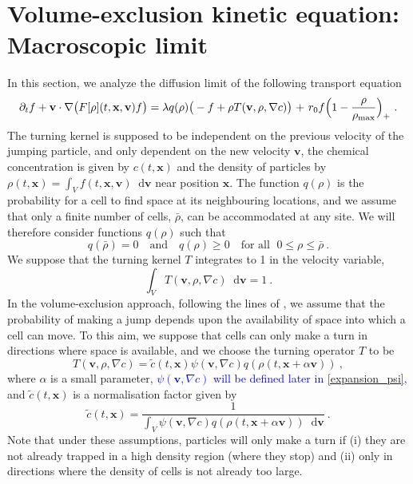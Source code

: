 \documentclass{article}
\newcommand*\diff{\mathop{}\!\mathrm{d}}
\begin{document}
\section{Volume-exclusion kinetic equation: Macroscopic limit}
\label{sec:model}
In this section, we analyze the diffusion limit of the following transport equation
\begin{equation}
    \partial_t f+\mathbf{v}\cdot \nabla\big(F[\rho](t,\mathbf{x},\mathbf{v}) f\big)= \lambda q(\rho)\big(-f+\rho T(\mathbf{v},\rho,\nabla c)\big){\ +\ r_0f\Bigl(1-\frac{\rho}{\rho_{\textnormal{max}}} \Bigr)_+}\ . \nonumber
\end{equation}
The turning kernel is supposed to be independent on the previous velocity of the jumping particle, and only dependent on the new velocity $\mathbf{v}$, the chemical concentration is given by $c(t,\mathbf{x})$ and the density of particles by $\rho(t,\mathbf{x})=\int_V f(t,\textbf{x},\mathbf{v})\diff \mathbf{v}$ near position $\mathbf{x}$.
\noindent The function $q(\rho)$ is the probability {for a cell to find} space at its neighbouring locations, and we assume that only a finite number of cells, $\bar{\rho}$, can be accommodated at any site. We will therefore consider functions $q(\rho)$ such that
\begin{equation}
q(\bar{\rho}) = 0 \quad \text{and} \quad q(\rho) \geq 0 \quad \text{for all } \; 0\leq \rho \leq \bar{\rho}\ . \nonumber
\end{equation}
We {suppose that the turning kernel $T$ integrates to 1 in the velocity variable},
\begin{equation}
\int_V T(\textbf{v},\rho,\nabla c)\diff \mathbf{v}=1\ . \nonumber
\end{equation}
In the volume-exclusion approach, following the lines of \cite{Hillen2009}, we assume that the probability of making a jump depends upon the availability of space into which {{a cell}} can move. To this aim, we suppose that cells can only make a turn in directions where space is available, and we choose the turning operator $T$ to be
\begin{equation*}
    T(\mathbf{v},\rho,\nabla c)=\tilde{c}(t,\mathbf{x})\psi(\mathbf{v},\nabla c) q(\rho(t,\mathbf{x}+ \alpha \mathbf{v}))\ ,
\end{equation*}
\noindent where $\alpha$ is a small parameter, \textcolor{blue}{$\psi(\mathbf{v},\nabla c)$ will be defined later in \eqref{expansion_psi},}  and $\tilde{c}(t,\mathbf{x})$ is a normalisation factor given by
\[
\tilde{c}(t,\mathbf{x})=\frac{1}{\displaystyle\int_{V} \psi(\mathbf{v},\nabla c) q(\rho(t,\mathbf{x}+ \alpha \mathbf{v}))\diff \mathbf{v} }\ .
\]
\noindent Note that under these assumptions, particles will only make a turn  if (i) they are not already trapped in a high density region (where they stop) and (ii) only in directions where the density of cells is not already too large. 
\end{document}
